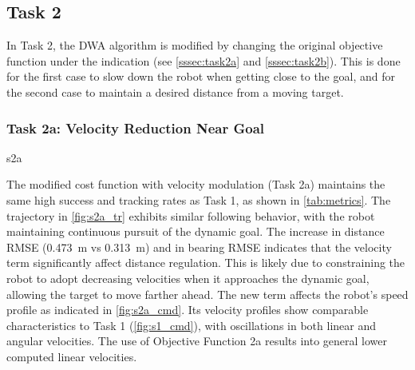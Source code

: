 \subsection{Task 2}
 

In Task 2, the DWA algorithm is modified by changing the original objective function under the indication (see \autoref{sssec:task2a} and \autoref{sssec:task2b}). This is done for the first case to slow down the robot when getting close to the goal, and for the second case to maintain a desired distance from a moving target.

\subsubsection{Task 2a: Velocity Reduction Near Goal}

{s2a}

The modified cost function with velocity modulation (Task 2a) maintains the same high success and tracking rates as Task 1, as shown in \autoref{tab:metrics}. The trajectory in \autoref{fig:s2a_tr} exhibits similar following behavior, with the robot maintaining continuous pursuit of the dynamic goal. The increase in distance RMSE (0.473~m vs 0.313~m) and in bearing RMSE indicates that the velocity term significantly affect distance regulation. This is likely due to constraining the robot to adopt decreasing velocities when it approaches the dynamic goal, allowing the target to move farther ahead. The new term affects the robot's speed profile as indicated in \autoref{fig:s2a_cmd}. Its velocity profiles show comparable characteristics to Task 1 (\autoref{fig:s1_cmd}), with oscillations in both linear and angular velocities. The use of Objective Function 2a results into general lower computed linear velocities.


